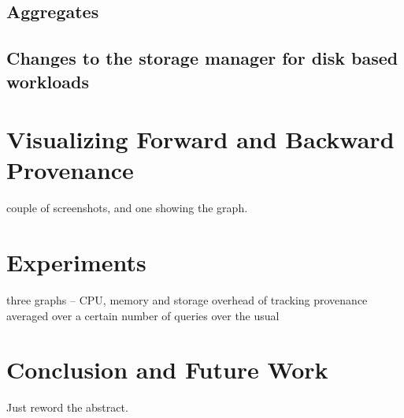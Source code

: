 \documentclass[11pt]{article}
\begin{document}
\subsection{Aggregates}

\subsection{Changes to the storage manager for disk based workloads}

\section{Visualizing Forward and Backward Provenance}

couple of screenshots, and one showing the graph.

\section{Experiments}

three graphs -- CPU, memory and storage overhead of tracking provenance averaged over a certain number of queries over the usual

\section{Conclusion and Future Work}

Just reword the abstract.



\end{document}
